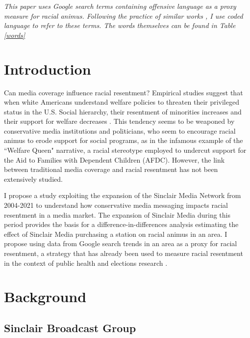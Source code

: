 \documentclass{article}
\begin{document}
\maketitle{}
\textit{This paper uses Google search terms containing offensive language as a proxy measure for racial animus. Following the practice of similar works \parencites{Stephens_Davidowitz_2014}{Chae_2015}{Chae_2018}{Isoya_2021}, I use coded language to refer to these terms. The words themselves can be found in Table \ref{words}}

\section{Introduction}

Can media coverage influence racial resentment?
Empirical studies suggest that when white Americans understand welfare policies to threaten their privileged status in the U.S. Social hierarchy, their resentment of minorities increases and their support for welfare decreases \parencites[][]{Willer_2016}{Wetts_2018}.
This tendency seems to be weaponed by conservative media institutions and politicians, who seem to encourage racial animus to erode support for social programs, as in the infamous example of the ``Welfare Queen" narrative, a racial stereotype employed to undercut support for the Aid to Families with Dependent Children (AFDC).
However, the link between traditional media coverage and racial resentment has not been extensively studied.

I propose a study exploiting the expansion of the Sinclair Media Network from 2004-2021 to understand how conservative media messaging impacts racial resentment in a media market.
The expansion of Sinclair Media during this period provides the basis for a difference-in-differences analysis estimating the effect of Sinclair Media purchasing a station on racial animus in an area.
I propose using data from Google search trends in an area as a proxy for racial resentment, a strategy that has already been used to measure racial resentment in the context of public health \parencites{Chae_2018}{Chae_2015} and elections research \parencite{Stephens_Davidowitz_2014}.


\section{Background}
\subsection{Sinclair Broadcast Group}
\end{document}
